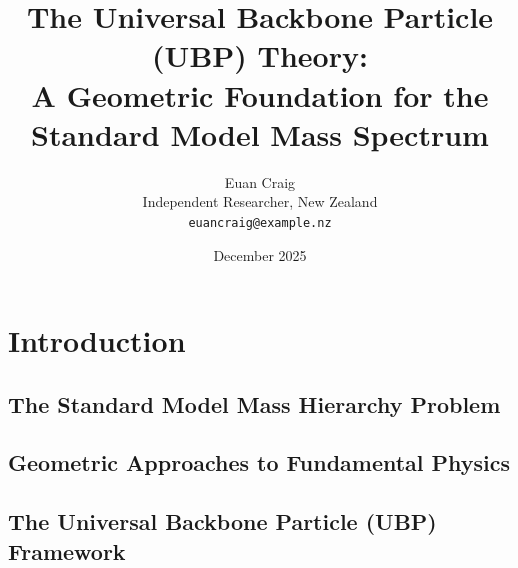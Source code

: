 \documentclass[11pt,a4paper]{article}
\title{\Large\textbf{The Universal Backbone Particle (UBP) Theory:\\
A Geometric Foundation for the Standard Model Mass Spectrum}}
\author{Euan Craig\\
\small Independent Researcher, New Zealand\\
\small \texttt{euancraig@example.nz}}
\date{December 2025}
\begin{document}
\maketitle

\begin{abstract}
\end{abstract}

\tableofcontents

\section{Introduction}

\subsection{The Standard Model Mass Hierarchy Problem}

\subsection{Geometric Approaches to Fundamental Physics}

\subsection{The Universal Backbone Particle (UBP) Framework}
\end{document}
